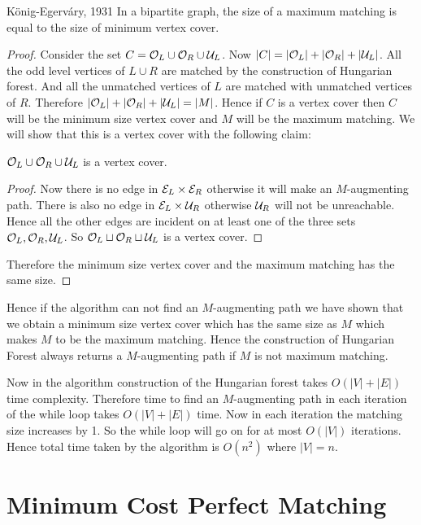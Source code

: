 \begin{Theorem}{K\"{o}nig-Egerv\'{a}ry, 1931}{}
	In a bipartite graph, the size of a maximum matching is equal to the size of minimum vertex cover.
\end{Theorem}
\begin{proof}
	Consider the set $C=\mathcal{O}_L\cup \mathcal{O}_R\cup \mathcal{U}_L$. Now $|C|=|\mathcal{O}_L|+|\mathcal{O}_R|+|\mathcal{U}_L|$. All the odd level vertices of $L\cup R$ are matched by the construction of Hungarian forest. And all the unmatched vertices of $L$ are matched with unmatched vertices of $R$. Therefore $|\mathcal{O}_L|+|\mathcal{O}_R|+|\mathcal{U}_L|=|M|$. Hence if $C$ is a vertex cover then $C$ will be the minimum size vertex cover and $M$ will be the maximum matching. We will show that this is a vertex cover with the following claim:
	\begin{claimwidth}
		\begin{claim}{}{}
			$\mathcal{O}_L\cup \mathcal{O}_R\cup \mathcal{U}_L$ is a vertex cover.
		\end{claim}
		\begin{proof}
			Now there is no edge in $\mathcal{E}_L\times \mathcal{E}_R$ otherwise it will make an $M$-augmenting path. There is also no edge in $\mathcal{E}_L\times \mathcal{U}_R$  otherwise $\mathcal{U}_R$ will not be unreachable. Hence all the other edges are incident on at least  one of the three sets $\mathcal{O}_L,\mathcal{O}_R,\mathcal{U}_L$. So $\mathcal{O}_L\sqcup \mathcal{O}_R\sqcup \mathcal{U}_L$ is a vertex cover. 
		\end{proof}
	\end{claimwidth}
	Therefore the minimum size vertex cover and the maximum matching has the same size.
\end{proof}

Hence if the algorithm can not find an $M$-augmenting path we have shown that we obtain a  minimum size vertex cover which has the same size as $M$ which makes $M$ to be the maximum matching. Hence the construction of Hungarian Forest always returns a $M$-augmenting path if $M$ is not maximum matching.

Now in the algorithm construction of the Hungarian forest takes $O(|V|+|E|)$ time complexity. Therefore time to find an $M$-augmenting path in each iteration of the while loop takes $O(|V|+|E|)$ time. Now in each iteration the matching size increases by 1. So the while loop will go on for at most $O(|V|)$ iterations. Hence total time taken by the algorithm is $O(n^2)$ where $|V|=n$.

\section{Minimum Cost Perfect Matching}
\begin{algoprob}
\end{algoprob}

